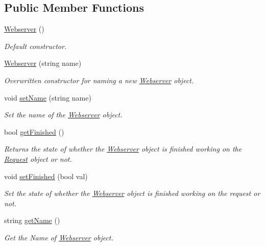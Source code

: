 \subsection*{Public Member Functions}
\begin{DoxyCompactItemize}
\item 
\mbox{\label{classWebserver_ac2a6f51bcc54efaaf5f4773a7c24f009}} 
\hyperlink{classWebserver_ac2a6f51bcc54efaaf5f4773a7c24f009}{Webserver} ()
\begin{DoxyCompactList}\small\item\em Default constructor. \end{DoxyCompactList}\item 
\hyperlink{classWebserver_ac66530e2c75f4489f3fd0a37d1265a21}{Webserver} (string name)
\begin{DoxyCompactList}\small\item\em Overwritten constructor for naming a new \hyperlink{classWebserver}{Webserver} object. \end{DoxyCompactList}\item 
void \hyperlink{classWebserver_aa4a2355e2a69cd811173efe85b158525}{set\+Name} (string name)
\begin{DoxyCompactList}\small\item\em Set the name of the \hyperlink{classWebserver}{Webserver} object. \end{DoxyCompactList}\item 
bool \hyperlink{classWebserver_a2244e2e2e5f992498a17b5caa90af73b}{get\+Finished} ()
\begin{DoxyCompactList}\small\item\em Returns the state of whether the \hyperlink{classWebserver}{Webserver} object is finished working on the \hyperlink{classRequest}{Request} object or not. \end{DoxyCompactList}\item 
void \hyperlink{classWebserver_a385a32307e09550c301660581bada2e5}{set\+Finished} (bool val)
\begin{DoxyCompactList}\small\item\em Set the state of whether the \hyperlink{classWebserver}{Webserver} object is finished working on the request or not. \end{DoxyCompactList}\item 
string \hyperlink{classWebserver_a7947099345655d9deceb05b37e06978c}{get\+Name} ()
\begin{DoxyCompactList}\small\item\em Get the Name of \hyperlink{classWebserver}{Webserver} object. \end{DoxyCompactList}\item 

\end{DoxyCompactItemize}
